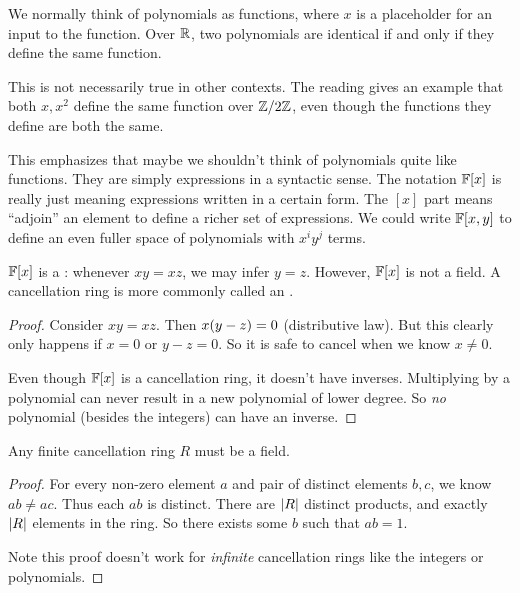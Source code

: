 \begin{remark}
  We normally think of polynomials as functions, where $x$ is a
  placeholder for an input to the function. Over $\mathbb{R}$, two polynomials
  are identical if and only if they define the same function.

  This is not necessarily true in other contexts. The reading gives an
  example that both $x, x^2$ define the same function over $\mathbb{Z} / 2\mathbb{Z}$,
  even though the functions they define are both the same.

  This emphasizes that maybe we shouldn't think of polynomials quite
  like functions. They are simply expressions in a syntactic sense. The
  notation $\mathbb{F}[x]$ is really just meaning expressions written in a
  certain form. The $[x]$ part means ``adjoin'' an element to define a
  richer set of expressions. We could write $\mathbb{F}[x, y]$ to define an
  even fuller space of polynomials with $x^i y^j$ terms.
\end{remark}

\begin{proposition}
  $\mathbb{F}[x]$ is a : whenever $xy = xz$, we may
  infer $y = z$. However, $\mathbb{F}[x]$ is not a field. A cancellation ring is
  more commonly called an .
\end{proposition}

\begin{proof}
  Consider $xy = xz$. Then $x \mathopen{}\left( {y - z} \right)\mathclose{} = 0$ (distributive law).
  But this clearly only happens if $x = 0$ or $y - z = 0$. So it is safe
  to cancel when we know $x \ne 0$.

  Even though $\mathbb{F}[x]$ is a cancellation ring, it doesn't have inverses.
  Multiplying by a polynomial can never result in a new polynomial of
  lower degree. So \emph{no} polynomial (besides the integers) can have
  an inverse.
\end{proof}

\begin{proposition}
  Any finite cancellation ring $R$ must be a field.
\end{proposition}

\begin{proof}
  For every non-zero element $a$ and pair of distinct elements $b, c$,
  we know $ab \ne ac$. Thus each $ab$ is distinct. There are $|R|$
  distinct products, and exactly $|R|$ elements in the ring. So
  there exists some $b$ such that $ab = 1$.

  Note this proof doesn't work for \emph{infinite} cancellation rings
  like the integers or polynomials.
\end{proof}

